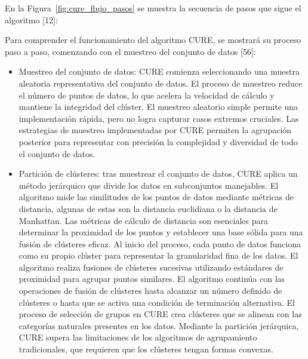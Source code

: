 En la Figura~\ref{fig:cure_flujo_pasos} se muestra la secuencia de pasos que sigue el algoritmo [12]:


Para comprender el funcionamiento del algoritmo CURE, se mostrar\'a su proceso paso a paso, comenzando con el muestreo del conjunto de datos [56]:

\begin{itemize}
  \item Muestreo del conjunto de datos: CURE comienza seleccionando una muestra aleatoria representativa del conjunto de datos. El proceso de muestreo reduce el n\'umero de puntos de datos, lo que acelera la velocidad de c\'alculo y mantiene la integridad del cl\'uster. El muestreo aleatorio simple permite una implementaci\'on r\'apida, pero no logra capturar casos extremos cruciales. Las estrategias de muestreo implementadas por CURE permiten la agrupaci\'on posterior para representar con precisi\'on la complejidad y diversidad de todo el conjunto de datos.
  \item Partici\'on de cl\'usteres: tras muestrear el conjunto de datos, CURE aplica un m\'etodo jer\'arquico que divide los datos en subconjuntos manejables. El algoritmo mide las similitudes de los puntos de datos mediante m\'etricas de distancia, algunas de estas son la distancia euclidiana o la distancia de Manhattan. Las m\'etricas de c\'alculo de distancia son esenciales para determinar la proximidad de los puntos y establecer una base s\'olida para una fusi\'on de cl\'usteres eficaz. Al inicio del proceso, cada punto de datos funciona como su propio cl\'uster para representar la granularidad fina de los datos. El algoritmo realiza fusiones de cl\'usteres sucesivas utilizando est\'andares de proximidad para agrupar puntos similares. El algoritmo contin\'ua con las operaciones de fusi\'on de cl\'usteres hasta alcanzar un n\'umero definido de cl\'usteres o hasta que se activa una condici\'on de terminaci\'on alternativa. El proceso de selecci\'on de grupos en CURE crea cl\'usteres que se alinean con las categor\'ias naturales presentes en los datos. Mediante la partici\'on jer\'arquica, CURE supera las limitaciones de los algoritmos de agrupamiento tradicionales, que requieren que los cl\'usteres tengan formas convexas.

\end{itemize}
